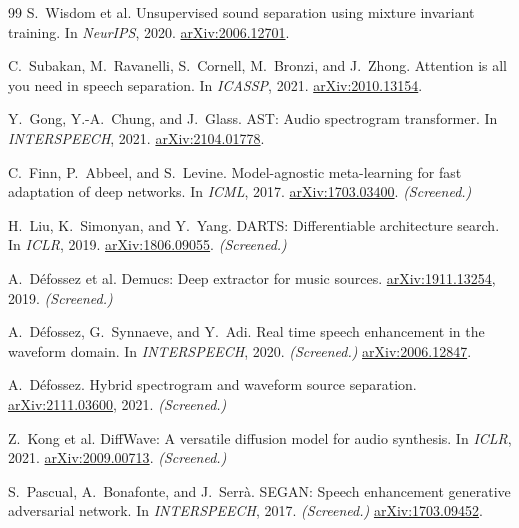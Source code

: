 \documentclass[10pt,twocolumn,letterpaper]{article}
\theoremstyle{remark}
\begin{document}
{\begin{thebibliography}{99}
S.~Wisdom et al.
\newblock Unsupervised sound separation using mixture invariant training.
\newblock In \emph{NeurIPS}, 2020.
\newblock \href{https://arxiv.org/abs/2006.12701}{arXiv:2006.12701}.

C.~Subakan, M.~Ravanelli, S.~Cornell, M.~Bronzi, and J.~Zhong.
\newblock Attention is all you need in speech separation.
\newblock In \emph{ICASSP}, 2021.
\newblock \href{https://arxiv.org/abs/2010.13154}{arXiv:2010.13154}.

Y.~Gong, Y.-A.~Chung, and J.~Glass.
\newblock AST: Audio spectrogram transformer.
\newblock In \emph{INTERSPEECH}, 2021.
\newblock \href{https://arxiv.org/abs/2104.01778}{arXiv:2104.01778}.

C.~Finn, P.~Abbeel, and S.~Levine.
\newblock Model-agnostic meta-learning for fast adaptation of deep networks.
\newblock In \emph{ICML}, 2017.
\newblock \href{https://arxiv.org/abs/1703.03400}{arXiv:1703.03400}. \textit{(Screened.)}

H.~Liu, K.~Simonyan, and Y.~Yang.
\newblock DARTS: Differentiable architecture search.
\newblock In \emph{ICLR}, 2019.
\newblock \href{https://arxiv.org/abs/1806.09055}{arXiv:1806.09055}. \textit{(Screened.)}

A.~D\'efossez et al.
\newblock Demucs: Deep extractor for music sources.
\newblock \href{https://arxiv.org/abs/1911.13254}{arXiv:1911.13254}, 2019. \textit{(Screened.)}

A.~D\'efossez, G.~Synnaeve, and Y.~Adi.
\newblock Real time speech enhancement in the waveform domain.
\newblock In \emph{INTERSPEECH}, 2020. \textit{(Screened.)}
\newblock \href{https://arxiv.org/abs/2006.12847}{arXiv:2006.12847}.

A.~D\'efossez.
\newblock Hybrid spectrogram and waveform source separation.
\newblock \href{https://arxiv.org/abs/2111.03600}{arXiv:2111.03600}, 2021. \textit{(Screened.)}

Z.~Kong et al.
\newblock DiffWave: A versatile diffusion model for audio synthesis.
\newblock In \emph{ICLR}, 2021.
\newblock \href{https://arxiv.org/abs/2009.00713}{arXiv:2009.00713}. \textit{(Screened.)}

S.~Pascual, A.~Bonafonte, and J.~Serr\`a.
\newblock SEGAN: Speech enhancement generative adversarial network.
\newblock In \emph{INTERSPEECH}, 2017. \textit{(Screened.)}
\newblock \href{https://arxiv.org/abs/1703.09452}{arXiv:1703.09452}.

\end{thebibliography}
}
\end{document}

